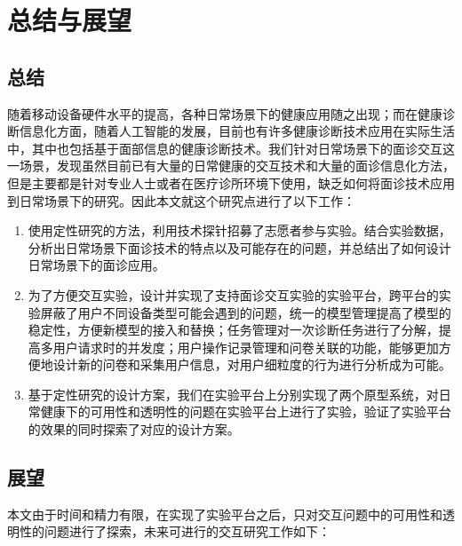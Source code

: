 \chapter{总结与展望}
\section{总结}
随着移动设备硬件水平的提高，各种日常场景下的健康应用随之出现；而在健康诊断信息化方面，随着人工智能的发展，目前也有许多健康诊断技术应用在实际生活中，其中也包括基于面部信息的健康诊断技术。我们针对日常场景下的面诊交互这一场景，发现虽然目前已有大量的日常健康的交互技术和大量的面诊信息化方法，但是主要都是针对专业人士或者在医疗诊所环境下使用，缺乏如何将面诊技术应用到日常场景下的研究。因此本文就这个研究点进行了以下工作：

\begin{enumerate}
	\item 使用定性研究的方法，利用技术探针招募了志愿者参与实验。结合实验数据，分析出日常场景下面诊技术的特点以及可能存在的问题，并总结出了如何设计日常场景下的面诊应用。

	\item 为了方便交互实验，设计并实现了支持面诊交互实验的实验平台，跨平台的实验屏蔽了用户不同设备类型可能会遇到的问题，统一的模型管理提高了模型的稳定性，方便新模型的接入和替换；任务管理对一次诊断任务进行了分解，提高多用户请求时的并发度；用户操作记录管理和问卷关联的功能，能够更加方便地设计新的问卷和采集用户信息，对用户细粒度的行为进行分析成为可能。

	\item 基于定性研究的设计方案，我们在实验平台上分别实现了两个原型系统，对日常健康下的可用性和透明性的问题在实验平台上进行了实验，验证了实验平台的效果的同时探索了对应的设计方案。
\end{enumerate}




\section{展望}
本文由于时间和精力有限，在实现了实验平台之后，只对交互问题中的可用性和透明性的问题进行了探索，未来可进行的交互研究工作如下：

